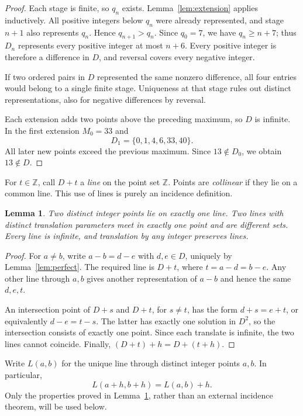 \documentclass[11pt]{article}
\newtheorem{lemma}[theorem]{Lemma}
\theoremstyle{remark}
\newcommand{\Z}{\mathbb Z}
\begin{document}
\begin{proof}
Each stage is finite, so $q_n$ exists. Lemma~\ref{lem:extension} applies
inductively. All positive integers below $q_n$ were already represented,
and stage $n+1$ also represents $q_n$. Hence $q_{n+1}>q_n$.
Since $q_0=7$, we have $q_n\ge n+7$; thus $D_n$ represents every
positive integer at most $n+6$. Every positive integer is therefore a
difference in $D$, and reversal covers every negative integer.

If two ordered pairs in $D$ represented the same nonzero difference,
all four entries would belong to a single finite stage. Uniqueness at
that stage rules out distinct representations, also for negative
differences by reversal.

Each extension adds two points above the preceding maximum, so $D$ is
infinite. In the first extension $M_0=33$ and
\[
 D_1=\{0,1,4,6,33,40\}.
\]
All later new points exceed the previous maximum. Since $13\notin D_0$,
we obtain $13\notin D$.
\end{proof}
For $t\in\Z$, call $D+t$ a \emph{line} on the point set $\Z$.
Points are \emph{collinear} if they lie on a common line.
This use of lines is purely an incidence definition.

\begin{lemma}\label{lem:incidence}
Two distinct integer points lie on exactly one line. Two lines with
distinct translation parameters meet in exactly one point and are
different sets. Every line is infinite, and translation by any integer
preserves lines.
\end{lemma}

\begin{proof}
For $a\ne b$, write $a-b=d-e$ with $d,e\in D$, uniquely by
Lemma~\ref{lem:perfect}. The required line is $D+t$, where
$t=a-d=b-e$. Any other line through $a,b$ gives another representation
of $a-b$ and hence the same $d,e,t$.

An intersection point of $D+s$ and $D+t$, for $s\ne t$, has the form
$d+s=e+t$, or equivalently $d-e=t-s$. The latter has exactly one
solution in $D^2$, so the intersection consists of exactly one point.
Since each translate is infinite, the two lines cannot coincide.
Finally, $(D+t)+h=D+(t+h)$.
\end{proof}

Write $L(a,b)$ for the unique line through distinct integer points
$a,b$. In particular,
\begin{equation}\label{eq:translation}
 L(a+h,b+h)=L(a,b)+h.
\end{equation}
Only the properties proved in Lemma~\ref{lem:incidence}, rather than an
external incidence theorem, will be used below.
\end{document}
